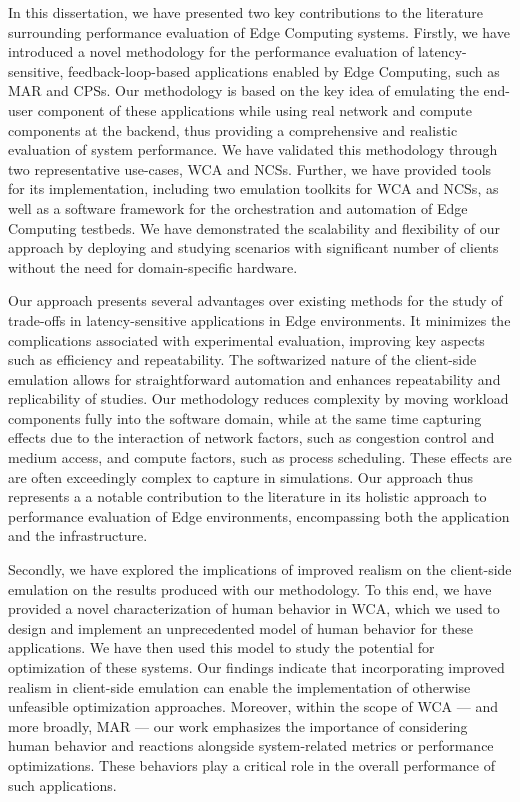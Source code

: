 In this dissertation, we have presented two key contributions to the literature surrounding performance evaluation of Edge Computing systems.
Firstly, we have introduced a novel methodology for the performance evaluation of latency-sensitive, feedback-loop-based applications enabled by Edge Computing, such as \gls{MAR} and \glspl{CPS}.
Our methodology is based on the key idea of emulating the end-user component of these applications while using real network and compute components at the backend, thus providing a comprehensive and realistic evaluation of system performance.
We have validated this methodology through two representative use-cases, \gls{WCA} and \glspl{NCS}.
Further, we have provided tools for its implementation, including two emulation toolkits for \gls{WCA} and \glspl{NCS}, as well as a software framework for the orchestration and automation of Edge Computing testbeds.
We have demonstrated the scalability and flexibility of our approach by deploying and studying scenarios with significant number of clients without the need for domain-specific hardware.

Our approach presents several advantages over existing methods for the study of trade-offs in latency-sensitive applications in Edge environments.
It minimizes the complications associated with experimental evaluation, improving key aspects such as efficiency and repeatability.
The softwarized nature of the client-side emulation allows for straightforward automation and enhances repeatability and replicability of studies.
Our methodology reduces complexity by moving workload components fully into the software domain, while at the same time capturing effects due to the interaction of network factors, such as congestion control and medium access, and compute factors, such as process scheduling.
These effects are are often exceedingly complex to capture in simulations.
Our approach thus represents a a notable contribution to the literature in its holistic approach to performance evaluation of Edge environments, encompassing both the application and the infrastructure.

Secondly, we have explored the implications of improved realism on the client-side emulation on the results produced with our methodology.
To this end, we have provided a novel characterization of human behavior in \gls{WCA}, which we used to design and implement an unprecedented model of human behavior for these applications.
We have then used this model to study the potential for optimization of these systems.
Our findings indicate that incorporating improved realism in client-side emulation can enable the implementation of otherwise unfeasible optimization approaches.
Moreover, within the scope of \gls{WCA} --- and more broadly, \gls{MAR} --- our work emphasizes the importance of considering human behavior and reactions alongside system-related metrics or performance optimizations.
These behaviors play a critical role in the overall performance of such applications.

